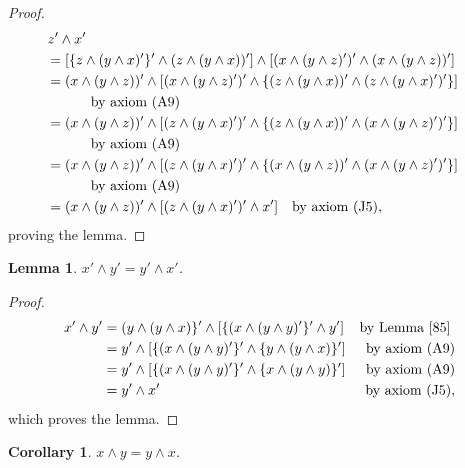 \documentclass{amsart}
\theoremstyle{plain}
\newtheorem{corollary}[theorem]{Corollary}
\newtheorem{lemma}[theorem]{Lemma}
\theoremstyle{problem}
\theoremstyle{definition}
\theoremstyle{remark}
\numberwithin{equation}{section}
\begin{document}
\begin{proof}
\begin{align*}
    z' \land x'\\
        &{\hspace{-1cm}}= [\{z \land (y \land x)'\}' \land (z \land (y \land x))'] \land [(x \land (y \land z)')' \land (x \land (y \land z))'] \\
        &{\hspace{-1cm}}= (x \land (y \land z))' \land [(x \land (y \land z)')' \land \{(z \land (y \land x))' \land (z \land (y \land x)')'\}]\\ &\text{   by axiom (A9)}\\
        &{\hspace{-1cm}}= (x \land (y \land z))' \land [(z \land (y \land x)')' \land \{(z \land (y \land x))' \land (x \land (y \land z)')'\}]\\  &\text{   by axiom (A9)} \\
        &{\hspace{-1cm}}= (x \land (y \land z))' \land [(z \land (y \land x)')' \land \{(x \land (y \land z))' \land (x \land (y \land z)')'\}]\\  &\text{   by axiom (A9)} \\
        &{\hspace{-1cm}}= (x \land (y \land z))' \land [(z \land (y \land x)')' \land x'] \quad \text{by axiom (J5)},
\end{align*}
proving the lemma.
\end{proof}
\begin{lemma} \label{86}
    $x' \land y' = y' \land x'$.
\end{lemma}
\begin{proof}
\begin{align*}
    x' \land y'
          &= (y \land (y \land x)\}' \land [\{(x \land (y \land y)'\}' \land y'] &\text{by Lemma \ref{85} }\\
          &= y' \land [\{(x \land (y \land y)'\}' \land \{y \land (y \land x)\}'] &\text{by axiom (A9)}\\
          &= y' \land [\{(x \land (y \land y)'\}' \land \{x \land (y \land y)\}'] &\text{by axiom (A9)}\\
          &= y' \land x'  &\text{by axiom (J5)},
\end{align*}
which proves the lemma.
\end{proof}
\begin{corollary} \label{87}
    $x \land y = y \land x$.
\end{corollary}
\end{document}
